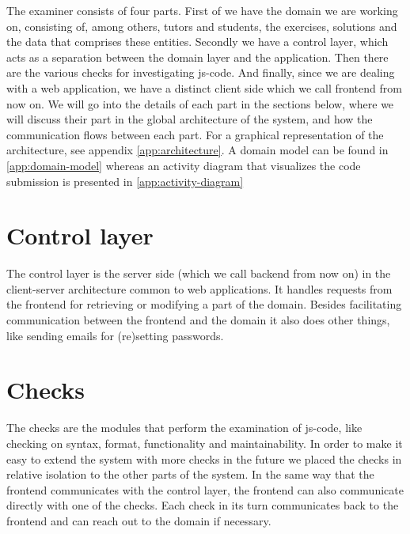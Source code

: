 %

The \gls{examiner} consists of four parts.
First of we have the domain we are working on, consisting of, among others,
tutors and students, the exercises, solutions
and the data that comprises these entities.
Secondly we have a control layer,
which acts as a separation between the domain layer and the application.
Then there are the various \glspl{check} for investigating \gls{js-code}.
And finally, since we are dealing with a web application,
we have a distinct client side which we call frontend from now on.
We will go into the details of each part in the sections below,
where we will discuss their part in the global architecture of the system,
and how the communication flows between each part. For a graphical
representation of the architecture, see appendix \ref{app:architecture}. A
domain model can be found in \ref{app:domain-model} whereas an activity diagram
that visualizes the code submission is presented in \ref{app:activity-diagram}

\section{Control layer}
The control layer is the server side (which we call backend from now on)
in the client-server architecture common to web applications.
It handles requests from the frontend
for retrieving or modifying a part of the domain.
Besides facilitating communication between the frontend and the domain
it also does other things, like sending emails for (re)setting passwords.

\section{Checks}
The \glspl{check} are the modules that perform the examination of \gls{js-code},
like checking on syntax, format, functionality and maintainability.
In order to make it easy to extend the system with more \glspl{check} in the future
we placed the \glspl{check} in relative isolation to the other parts of the system.
In the same way that the frontend communicates with the control layer,
the frontend can also communicate directly with one of the \glspl{check}.
Each \gls{check} in its turn communicates back to the frontend
and can reach out to the domain if necessary.

